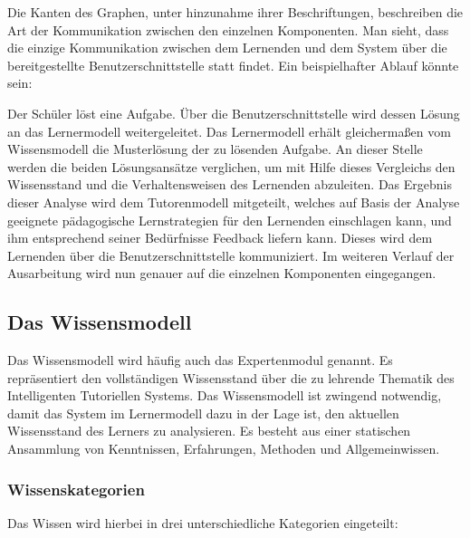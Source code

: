 Die Kanten des Graphen, unter hinzunahme ihrer Beschriftungen, beschreiben die Art der
Kommunikation zwischen den einzelnen Komponenten.
Man sieht, dass die einzige Kommunikation zwischen dem Lernenden und dem System über die
bereitgestellte Benutzerschnittstelle statt findet. Ein beispielhafter Ablauf könnte sein:

Der Schüler löst eine Aufgabe. Über die Benutzerschnittstelle wird dessen Lösung
an das Lernermodell weitergeleitet. Das Lernermodell erhält gleichermaßen vom Wissensmodell
die Musterlösung der zu lösenden Aufgabe. An dieser Stelle werden die beiden Lösungsansätze
verglichen, um mit Hilfe dieses Vergleichs den Wissensstand und die Verhaltensweisen
des Lernenden abzuleiten. Das Ergebnis dieser Analyse wird dem Tutorenmodell mitgeteilt, welches
auf Basis der Analyse geeignete pädagogische Lernstrategien für den Lernenden einschlagen kann,
und ihm entsprechend seiner Bedürfnisse Feedback liefern kann. Dieses wird dem Lernenden
über die Benutzerschnittstelle kommuniziert. Im weiteren Verlauf der Ausarbeitung
wird nun genauer auf die einzelnen Komponenten eingegangen.

\subsection{Das Wissensmodell}

Das Wissensmodell wird häufig auch das Expertenmodul genannt. Es repräsentiert den vollständigen
Wissensstand über die zu lehrende Thematik des Intelligenten Tutoriellen Systems.
Das Wissensmodell ist zwingend notwendig, damit das System im Lernermodell dazu in der Lage ist,
den aktuellen Wissensstand des Lerners zu analysieren.
Es besteht aus einer statischen Ansammlung von Kenntnissen, Erfahrungen, Methoden und Allgemeinwissen.

\subsubsection{Wissenskategorien}
Das Wissen wird hierbei in drei unterschiedliche Kategorien eingeteilt:

